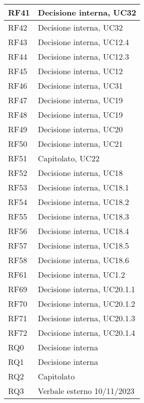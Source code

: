 \begin{center}
\begin{longtable}{|C{5cm}|C{5cm}|}
        \hline
        RF41 & Decisione interna, UC32 \\
        \hline
        RF42 & Decisione interna, UC32 \\
        \hline
        RF43 & Decisione interna, UC12.4 \\
        \hline
        RF44 & Decisione interna, UC12.3 \\
        \hline
        RF45 & Decisione interna, UC12 \\
        \hline
        RF46 & Decisione interna, UC31 \\
        \hline
        RF47 & Decisione interna, UC19 \\
        \hline
        RF48 & Decisione interna, UC19 \\
        \hline
        RF49 & Decisione interna, UC20 \\
        \hline
        RF50 & Decisione interna, UC21 \\
        \hline
        RF51 & Capitolato, UC22 \\
        \hline
        RF52 & Decisione interna, UC18 \\
        \hline
        RF53 & Decisione interna, UC18.1 \\
        \hline
        RF54 & Decisione interna, UC18.2 \\
        \hline
        RF55 & Decisione interna, UC18.3 \\
        \hline
        RF56 & Decisione interna, UC18.4 \\
        \hline
        RF57 & Decisione interna, UC18.5 \\
        \hline
        RF58 & Decisione interna, UC18.6 \\
        \hline
        RF61 & Decisione interna, UC1.2 \\
        \hline
        RF69 & Decisione interna, UC20.1.1\\
        \hline
        RF70 & Decisione interna, UC20.1.2\\
        \hline
        RF71 & Decisione interna, UC20.1.3\\
        \hline
        RF72 & Decisione interna, UC20.1.4\\
        \hline
        RQ0 & Decisione interna \\
        \hline
        RQ1 & Decisione interna \\
        \hline
        RQ2 & Capitolato \\
        \hline
        RQ3 & Verbale esterno 10/11/2023 \\

\end{longtable}
\end{center}
